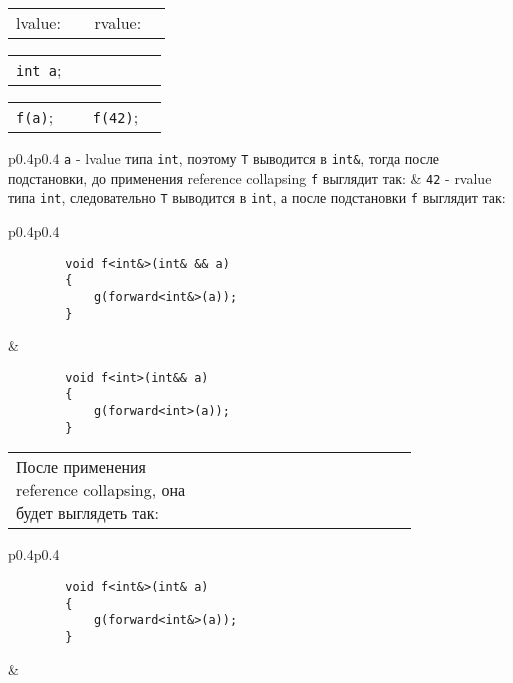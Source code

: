 \begin{center}
	\begin{tabular}{p{0.4\linewidth}p{0.4\linewidth}}
		lvalue: & rvalue:\\
	\end{tabular}
	
	\begin{tabular}{p{0.4\linewidth}p{0.4\linewidth}}
		\texttt{int a}; & \vspace{\baselineskip}\\
	\end{tabular}
	
	\begin{tabular}{p{0.4\linewidth}p{0.4\linewidth}}
		\texttt{f(a)}; & \texttt{f(42)};\\
	\end{tabular}
	
	\begin{tabular}{p{0.4\linewidth}p{0.4\linewidth}}
		\texttt{a} - lvalue типа \texttt{int}, поэтому \texttt{T} выводится в \texttt{int&}, тогда после подстановки, до применения reference collapsing \texttt{f} выглядит так: & \texttt{42} - rvalue типа \texttt{int}, следовательно \texttt{Т} выводится в \texttt{int}, а после подстановки \texttt{f} выглядит так:\\
	\end{tabular}
	
	\begin{tabular}{p{0.4\linewidth}p{0.4\linewidth}}
		\begin{verbatim}
		void f<int&>(int& && a)
		{
		    g(forward<int&>(a));
		}
		\end{verbatim}
		&
		\begin{verbatim}
		void f<int>(int&& a)
		{
		    g(forward<int>(a));
		}
		\end{verbatim}
	\end{tabular}
	
	\begin{tabular}{p{0.4\linewidth}p{0.4\linewidth}}
		После применения reference collapsing, она будет выглядеть так:
		& \vspace{\baselineskip}\\
	\end{tabular}
	
	\begin{tabular}{p{0.4\linewidth}p{0.4\linewidth}}
		\begin{verbatim}
		void f<int&>(int& a)
		{
		    g(forward<int&>(a));
		}
		\end{verbatim}
		& \vspace{\baselineskip}\\
	\end{tabular}
	

\end{center}
